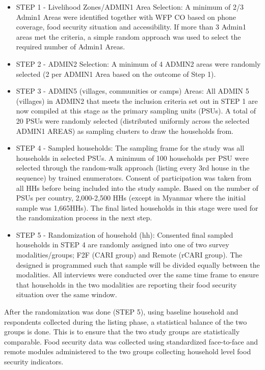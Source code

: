 \documentclass[11pt,harvard]{article}
\begin{document}
\begin{itemize}[label=--, left=1.5em]
	\item[1.] STEP 1 - Livelihood Zones/ADMIN1 Area Selection: A minimum of 2/3 Admin1 Areas were identified together with WFP CO based on phone coverage, food security situation and accessibility. If more than 3 Admin1 areas met the criteria, a simple random approach was used to select the required number of Admin1 Areas.
		
	\item[2.] STEP 2 - ADMIN2 Selection: A minimum of 4 ADMIN2 areas were randomly selected (2 per ADMIN1 Area based on the outcome of Step 1). 
		
	\item[3.] STEP 3 - ADMIN5 (villages, communities or camps) Areas: All ADMIN 5 (villages) in ADMIN2 that meets the inclusion criteria set out in STEP 1 are now compiled at this stage as the primary sampling units (PSUs). A total of 20 PSUs were randomly selected (distributed uniformly across the selected ADMIN1 AREAS) as sampling clusters to draw the households from. 
		
	\item[4.] STEP 4 - Sampled households: The sampling frame for the study was all households in selected PSUs. A minimum of 100 households per PSU were selected through the random-walk approach (listing every 3rd house in the sequence) by trained enumerators. Consent of participation was taken from all HHs before being included into the study sample. Based on the number of PSUs per country, 2,000-2,500 HHs (except in Myanmar where the initial sample was 1,665HHs). The final listed households in this stage were used for the randomization process in the next step.
		
	\item[5.] STEP 5 - Randomization of household (hh): Consented final sampled households in STEP 4 are randomly assigned into one of two survey modalities/groups; F2F (CARI group) and Remote (rCARI group). The designed is programmed such that sample will be divided equally between the modalities. All interviews were conducted over the same time frame to ensure that households in the two modalities are reporting their food security situation over the same window. 
		
\end{itemize}
	
After the randomization was done (STEP 5), using baseline household and respondents collected during the listing phase, a statistical balance of the two groups is done. This is to ensure that the two study groups are statistically comparable. Food security data was collected using standardized face-to-face and remote modules administered to the two groups collecting household level food security indicators. 
	
\end{document}
